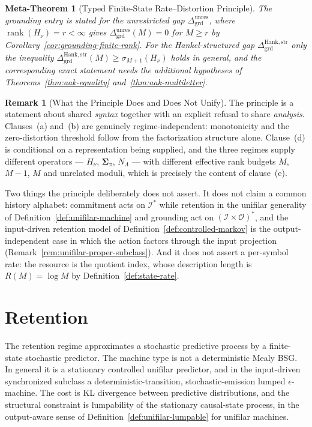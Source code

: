 \documentclass[12pt]{article}
\newtheorem{metatheorem}[theorem]{Meta-Theorem}
\theoremstyle{definition}
\newtheorem{remark}[theorem]{Remark}
\newcommand{\Dunres}{\Delta_{\mathrm{grd}}^{\mathrm{unres}}}
\newcommand{\DHankstr}{\Delta_{\mathrm{grd}}^{\mathrm{Hank,str}}}
\begin{document}
\begin{metatheorem}[Typed Finite-State Rate--Distortion Principle]
\noindent
The grounding entry is stated for the \emph{unrestricted} gap $\Dunres$, where
$\operatorname{rank}(H_\nu)=r<\infty$ gives $\Dunres(M)=0$ for $M\ge r$ by
Corollary~\ref{cor:grounding-finite-rank}.  For the Hankel-structured gap
$\DHankstr$ only the inequality $\DHankstr(M)\ge\sigma_{M+1}(H_\nu)$ holds in
general, and the corresponding exact statement needs the additional hypotheses
of Theorems~\ref{thm:aak-equality} and~\ref{thm:aak-multiletter}.
\end{metatheorem}

\begin{remark}[What the Principle Does and Does Not Unify]
\label{rem:typed-principle-scope}
The principle is a statement about shared \emph{syntax} together with an
explicit refusal to share \emph{analysis}.  Clauses~(a) and~(b) are genuinely
regime-independent: monotonicity and the zero-distortion threshold follow from
the factorization structure alone.  Clause~(d) is conditional on a
representation being supplied, and the three regimes supply different operators
--- $H_\nu$, $\bm{\Sigma}_\pi$, $N_\Lambda$ --- with different effective rank
budgets $M$, $M-1$, $M$ and unrelated moduli, which is precisely the content of
clause~(e).

Two things the principle deliberately does not assert.  It does not claim a
common history alphabet: commitment acts on $\mathcal I^*$ while retention in
the unifilar generality of Definition~\ref{def:unifilar-machine} and grounding
act on $(\mathcal I\times\mathcal O)^*$, and the input-driven retention model
of Definition~\ref{def:controlled-markov} is the output-independent case in
which the action factors through the input projection
(Remark~\ref{rem:unifilar-proper-subclass}).  And it does not assert a
per-symbol rate: the resource is the quotient index, whose description length
is $R(M)=\log M$ by Definition~\ref{def:state-rate}.
\end{remark}

\section{Retention}
\label{sec:retention}

The retention regime approximates a stochastic predictive process by a
finite-state stochastic predictor.  The machine type is not a deterministic
Mealy BSG.  In general it is a stationary controlled unifilar predictor, and in
the input-driven synchronized subclass a deterministic-transition,
stochastic-emission lumped $\epsilon$-machine.  The cost is KL divergence
between predictive distributions, and the structural constraint is lumpability
of the stationary causal-state process, in the output-aware sense of
Definition~\ref{def:unifilar-lumpable} for unifilar machines.
\end{document}
